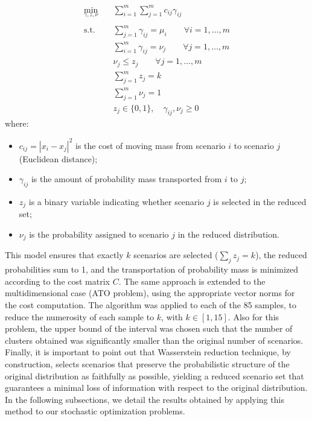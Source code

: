 \documentclass[a4paper,12pt]{article}
\begin{document}
	\[
	\begin{aligned}
		\min_{\gamma, z, \nu} \quad & \sum_{i=1}^m \sum_{j=1}^m c_{ij} \gamma_{ij} \\\\
		\text{s.t.} \quad
		& \sum_{j=1}^m \gamma_{ij} = \mu_i \qquad \forall i=1,\ldots,m \\
		& \sum_{i=1}^m \gamma_{ij} = \nu_j \qquad \forall j=1,\ldots,m \\
		& \nu_j \leq z_j \qquad \forall j=1,\ldots,m \\
		& \sum_{j=1}^m z_j = k \\
		& \sum_{j=1}^m \nu_j = 1 \\
		& z_j \in \{0,1\}, \quad \gamma_{ij}, \nu_j \geq 0
	\end{aligned}
	\]
	where:
	\begin{itemize}
		\item $c_{ij} = |x_i - x_j|^2$ is the cost of moving mass from scenario $i$ to scenario $j$ (Euclidean distance);
		\item $\gamma_{ij}$ is the amount of probability mass transported from $i$ to $j$;
		\item $z_j$ is a binary variable indicating whether scenario $j$ is selected in the reduced set;
		\item $\nu_j$ is the probability assigned to scenario $j$ in the reduced distribution.
	\end{itemize}
	\vspace{0.20cm}
	This model ensures that exactly $k$ scenarios are selected ($\sum_j z_j = k$), the reduced probabilities sum to 1, and the transportation of probability mass is minimized according to the cost matrix $C$. The same approach is extended to the multidimensional case (ATO problem), using the appropriate vector norms for the cost computation.
	The algorithm was applied to each of the 85 samples, to reduce the numerosity of each sample to $k$, with $k \in [1,15]$. Also for this problem, the upper bound of the interval was chosen such that the number of clusters obtained was significantly smaller than the original number of scenarios. \\
	
	\noindent Finally, it is important to point out that Wasserstein reduction technique, by construction, selects scenarios that preserve the probabilistic structure of the original distribution as faithfully as possible, yielding a reduced scenario set that guarantees a minimal loss of information with respect to the original distribution. In the following subsections, we detail the results obtained by applying this method to our stochastic optimization problems. 
	
\end{document}
